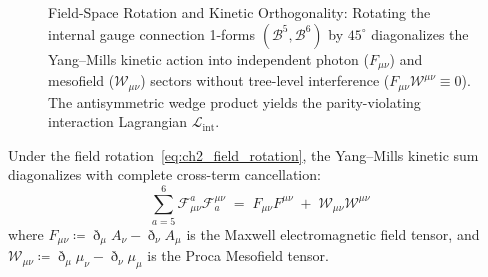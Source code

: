 \documentclass[
    12pt,
    a4paper,
    headings=normal,
    twoside=false,
    open=any,
    parskip=half
]{scrbook}
\newcommand{\ethop}{\eth}
\begin{document}
\begin{figure}[htbp]
\caption{Field-Space Rotation and Kinetic Orthogonality: Rotating the internal gauge connection 1-forms $(\mathcal{B}^5, \mathcal{B}^6)$ by $45^\circ$ diagonalizes the Yang--Mills kinetic action into independent photon ($F_{\mu\nu}$) and mesofield ($\mathcal{W}_{\mu\nu}$) sectors without tree-level interference ($F_{\mu\nu}\mathcal{W}^{\mu\nu} \equiv 0$). The antisymmetric wedge product yields the parity-violating interaction Lagrangian $\mathcal{L}_{\text{int}}$.}
\label{fig:ch2_field_space_rotation}
\end{figure}

\begin{phystheorem}\label{thm:ch2_kinetic_orthogonality}
Under the field rotation~\eqref{eq:ch2_field_rotation}, the Yang--Mills kinetic sum diagonalizes with complete cross-term cancellation:
\begin{equation}
\boxed{\sum_{a=5}^6 \mathcal{F}_{\mu\nu}^a \mathcal{F}^{\mu\nu}_a \;=\; F_{\mu\nu} F^{\mu\nu} \;+\; \mathcal{W}_{\mu\nu} \mathcal{W}^{\mu\nu}}
\label{eq:ch2_kinetic_orthogonality_master}
\end{equation}
where $F_{\mu\nu} \coloneqq \ethop_\mu A_\nu - \ethop_\nu A_\mu$ is the Maxwell electromagnetic field tensor, and $\mathcal{W}_{\mu\nu} \coloneqq \ethop_\mu \mu_\nu - \ethop_\nu \mu_\mu$ is the Proca Mesofield tensor.
\end{phystheorem}
\end{document}
